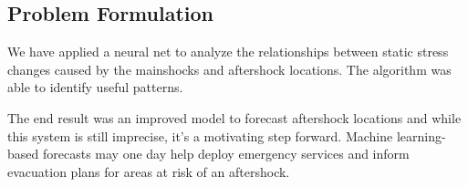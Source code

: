 \documentclass[journal,transmag]{IEEEtran}
\begin{document}
\vspace{0.5em}
\subsection{Problem Formulation}
\vspace{0.5em}

\par We have applied a neural net to analyze the relationships between static stress changes caused by the mainshocks and aftershock locations. The algorithm was able to identify useful patterns.
\par The end result was an improved model to forecast aftershock locations and while this system is still imprecise, it's a motivating step forward. Machine learning-based forecasts may one day help deploy emergency services and inform evacuation plans for areas at risk of an aftershock.
\end{document}
